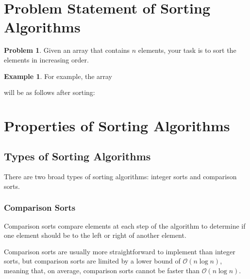 \documentclass[twoside,12pt,a4paper,english]{book}
\theoremstyle{definition}
\newtheorem*{exmp}{Example}
\theoremstyle{problemstyle}
\newtheorem*{problem}{Problem} %
\theoremstyle{problemstyle}
\theoremstyle{problemstyle}
\begin{document}
\section{Problem Statement of Sorting Algorithms}
\begin{problem}
Given an array that contains $n$ elements, your task is to sort the elements in
increasing order.
\end{problem}
\begin{exmp}
For example, the array
\begin{center}
\end{center}
will be as follows after sorting:
\begin{center}
\end{center}
\end{exmp}
\section{Properties of Sorting Algorithms}
\subsection{Types of Sorting Algorithms}
There are two broad types of sorting algorithms: integer sorts and comparison sorts.
\subsubsection{Comparison Sorts}
Comparison sorts compare elements at each step of the algorithm to determine if one element should be to the left or right of another element.

Comparison sorts are usually more straightforward to implement than integer sorts, but comparison sorts are limited by a lower bound of $\mathcal{O}(n\log{n})$, meaning that, on average, comparison sorts cannot be faster than $\mathcal{O}(n\log{n})$.
\end{document}

